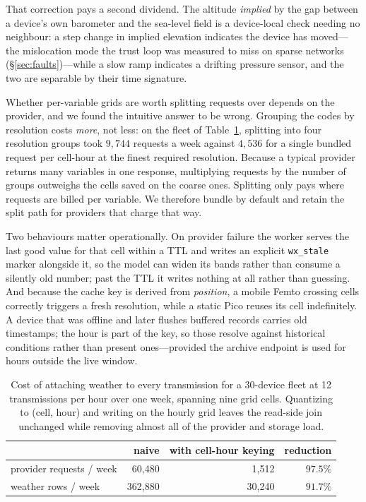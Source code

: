 \documentclass[10pt]{article}
\begin{document}
That correction pays a second dividend. The altitude \emph{implied} by the gap
between a device's own barometer and the sea-level field is a device-local check
needing no neighbour: a step change in implied elevation indicates the device has
moved---the mislocation mode the trust loop was measured to miss on sparse
networks (\S\ref{sec:faults})---while a slow ramp indicates a drifting pressure
sensor, and the two are separable by their time signature.

Whether per-variable grids are worth splitting requests over depends on the
provider, and we found the intuitive answer to be wrong. Grouping the codes by
resolution costs \emph{more}, not less: on the fleet of Table~\ref{tab:wx},
splitting into four resolution groups took $9{,}744$ requests a week against
$4{,}536$ for a single bundled request per cell-hour at the finest required
resolution. Because a typical provider returns many variables in one response,
multiplying requests by the number of groups outweighs the cells saved on the
coarse ones. Splitting only pays where requests are billed per variable. We
therefore bundle by default and retain the split path for providers that charge
that way.

Two behaviours matter operationally. On provider failure the worker serves the
last good value for that cell within a TTL and writes an explicit
\texttt{wx\_stale} marker alongside it, so the model can widen its bands rather
than consume a silently old number; past the TTL it writes nothing at all rather
than guessing. And because the cache key is derived from \emph{position}, a mobile
Femto crossing cells correctly triggers a fresh resolution, while a static Pico
reuses its cell indefinitely. A device that was offline and later flushes buffered
records carries old timestamps; the hour is part of the key, so those resolve
against historical conditions rather than present ones---provided the archive
endpoint is used for hours outside the live window.

\begin{table}[t]
\centering
\small
\begin{tabular}{@{}lrrr@{}}
\toprule
& naive & with cell-hour keying & reduction \\
\midrule
provider requests / week & 60{,}480 & 1{,}512 & $97.5\%$ \\
weather rows / week & 362{,}880 & 30{,}240 & $91.7\%$ \\
\bottomrule
\end{tabular}
\caption{Cost of attaching weather to every transmission for a 30-device fleet at
12 transmissions per hour over one week, spanning nine grid cells. Quantizing to
(cell, hour) and writing on the hourly grid leaves the read-side join unchanged
while removing almost all of the provider and storage load.}
\label{tab:wx}
\end{table}
\end{document}
